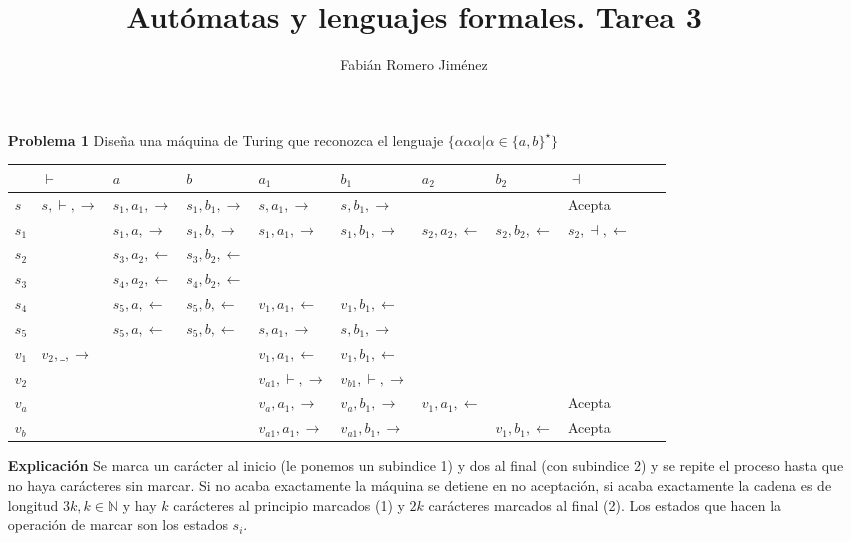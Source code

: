\documentclass{article}
\title{Autómatas y lenguajes formales. Tarea 3}
\author{Fabián Romero Jiménez}
\date{}
\begin{document}
\maketitle
\begin{enumerate}
\item[\bf{Problema 1}] Diseña una máquina de Turing que reconozca el lenguaje $\{\alpha\alpha\alpha | \alpha \in \{a, b\}^\star \}$

\begin{tabular}{|l||l|l|l|l|l|l|l|l|l|l|}
  \hline
   & $\vdash$ &$a$& $b$&$a_1$ & $b_1$ & $a_2$ & $b_2$  & $\dashv$ \\
  \hline  
  \hline  
  $s$      & $s,\vdash,\rightarrow$ &  $s_1,a_1,\rightarrow$ &  $s_1,b_1,\rightarrow$ &$s,a_1,\rightarrow$ &$s,b_1,\rightarrow$ &  &  & Acepta \\  
  \hline  
  $s_1$   &  &  $s_1,a,\rightarrow$ &  $s_1,b,\rightarrow$ & $s_1,a_1,\rightarrow$ &$s_1,b_1,\rightarrow$ &  $s_2,a_2,\leftarrow$ &  $s_2,b_2,\leftarrow$  & $s_2,\dashv,\leftarrow$  \\
  \hline  
  $s_2$    &  &  $s_3,a_2,\leftarrow$ &  $s_3,b_2,\leftarrow$ &  &  & & &\\  
  \hline  
  $s_3$    &  &  $s_4,a_2,\leftarrow$ &  $s_4,b_2,\leftarrow$ &  &  & & &\\  
  \hline  
  $s_4$    &  &  $s_5,a,\leftarrow$ &  $s_5,b,\leftarrow$ & $v_1,a_1,\leftarrow$  & $v_1,b_1,\leftarrow$  & & &\\  
  \hline  
  $s_5$    &  &  $s_5,a,\leftarrow$ &  $s_5,b,\leftarrow$ & $s,a_1,\rightarrow$  & $s,b_1,\rightarrow$  & & &\\
  \hline
  $v_1$    & $v_2,\_,\rightarrow$ & & & $v_1,a_1,\leftarrow$  & $v_1,b_1,\leftarrow$  & & &\\  
  \hline
  $v_2$    & &   &   & $v_{a1},\vdash,\rightarrow$ &  $v_{b1},\vdash,\rightarrow$ & & &  \\  
  \hline  
  $v_{a}$      &  &  & & $v_{a},a_1,\rightarrow$ &  $v_{a},b_1,\rightarrow$ & $v_1,a_1,\leftarrow$ &  & Acepta \\  
  \hline  
  $v_{b}$      &  &  & & $v_{a1},a_1,\rightarrow$ &  $v_{a1},b_1,\rightarrow$ & &$v_1,b_1,\leftarrow$  & Acepta \\  
  \hline  
\end{tabular}

\item[\bf{Explicación}]
Se marca un carácter al inicio (le ponemos un subindice 1) y dos al final (con subindice 2) y se repite el proceso hasta que no haya carácteres sin marcar.
Si no acaba exactamente la máquina se detiene en no aceptación, si acaba exactamente la cadena es de longitud $3k, k \in \mathbb{N}$ y hay $k$ carácteres al principio marcados (1) y $2k$ carácteres marcados al final (2). Los estados que hacen la operación de marcar son los estados $s_i$.


\end{enumerate}
\end{document}
